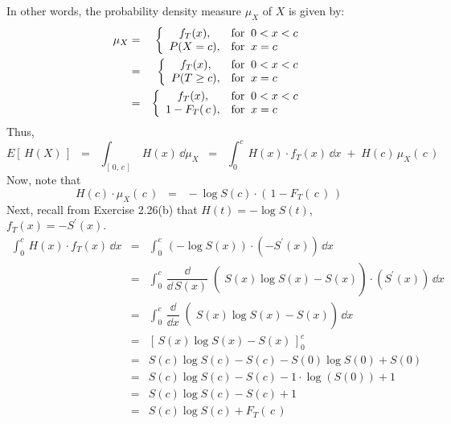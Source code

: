 In other words, the probability density measure $\mu_{X}$ of $X$ is given by:
\begin{eqnarray*}
\mu_{X} 
&=&
\left\{\begin{array}{cl}
f_{T}(x), & \textnormal{for}\;\; 0 < x < c \\
P(X = c), & \textnormal{for}\;\; x = c \\
\end{array}\right.
\\
&=&
\left\{\begin{array}{cl}
f_{T}(x),    & \textnormal{for}\;\; 0< x < c \\
P(T \geq c), & \textnormal{for}\;\; x = c \\
\end{array}\right.
\\
&=&
\left\{\begin{array}{cl}
f_{T}(x),         & \textnormal{for}\;\; 0< x < c \\
1 - F_{T}(\,c\,), & \textnormal{for}\;\; x = c \\
\end{array}\right.
\\
\end{eqnarray*}
Thus,
\begin{equation*}
E\left[\,H(X)\,\right]
\;\;=\;\; \int_{[\,0,\,c\,]}\,H(x)\,\dd\mu_{X}
\;\;=\;\; \int_{0}^{c}\,H(x)\cdot f_{T}(x)\,\dd x \;+\; H(c)\,\mu_{X}(\,c\,)
\end{equation*}
Now, note that
\begin{equation*}
H(c)\cdot \mu_{X}(\,c\,)
\;\; = \;\;
-\log S(c) \cdot \left(\,1 - F_{T}(\,c\,)\,\right)
\end{equation*}
Next, recall from Exercise 2.26(b) that $H(t) = - \log S(t)$, $f_{T}(x) = - S^{\prime}(x)$.
\begin{eqnarray*}
    \int_{0}^{c}\,H(x)\cdot f_{T}(x)\,\dd x
&=& \int_{0}^{c}\,\left(- \log S(x)\right) \cdot \left(-S^{\prime}(x)\right)\,\dd x \\
&=& \int_{0}^{c}\,\left.\left.\dfrac{\dd}{\dd\,S(x)}\right(S(x)\log S(x)-S(x)\right) \cdot \left(S^{\prime}(x)\right)\,\dd x \\
&=& \int_{0}^{c}\,\left.\left.\dfrac{\dd}{\dd x}\right(S(x)\log S(x)-S(x)\right)\,\dd x \\
&=& \left[\,S(x)\log S(x)-S(x)\,\right]_{0}^{c} \\
&=& S(c)\log S(c) - S(c) - S(0)\log S(0) + S(0) \\
&=& S(c)\log S(c) - S(c) - 1\cdot\log(S(0)) + 1 \\
&=& S(c)\log S(c) - S(c) + 1 \\
&=& S(c)\log S(c) + F_{T}(\,c\,) \\
\end{eqnarray*}
